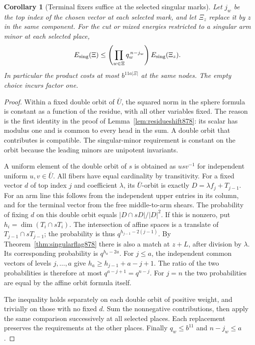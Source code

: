 \documentclass[a4paper,11pt]{article}
\newtheorem{corollary}[proposition]{Corollary}
\theoremstyle{definition}
\theoremstyle{remark}
\numberwithin{equation}{section}
\begin{document}
\begin{corollary}[Terminal fixers suffice at the selected singular marks]
\leavevmode\label{cor:terminalfixer878}
Let \(j_w\) be the top index of the chosen vector at each selected
mark, and let \(\Xi_z\) replace it by \(z\) in the same component.
For the cut or mixed energies restricted to a singular arm minor
at each selected place,
\begin{equation}
             E_{\rm sing}(\Xi)
       \le \left(\prod_{w\in\Xi}q_w^{\,n-j_w}\right)
                         E_{\rm sing}(\Xi_z).
 \label{eq:terminalfixer878}
\end{equation}
In particular the product costs at most \(b^{11a|\Xi|}\) at the same
nodes. The empty choice incurs factor one.
\end{corollary}
\begin{proof}
Within a fixed double orbit of \(\bar U\), the squared norm in the
sphere formula is constant as a function of the residue, with all
other variables fixed. The reason is the first identity in the proof
of Lemma~\ref{lem:residueshift878}: its scalar has modulus one and is
common to every head in the sum. A double orbit that contributes
is compatible. The singular-minor requirement is constant on the
orbit because the leading minors are unipotent invariants.

A uniform element of the double orbit of \(s\) is obtained as
\(u s v^{-1}\) for independent uniform \(u,v\in\bar U\). All fibers
have equal cardinality by transitivity. For a fixed vector \(d\)
of top index \(j\) and coefficient \(\lambda\), its \(\bar U\)-orbit
is exactly \(D=\lambda f_j+T_{j-1}\). For an arm line this follows
from the independent upper entries in its column, and for the
terminal vector from the free middle-to-arm shears. The probability
of fixing \(d\) on this double orbit equals
\(|D\cap sD|/|D|^2\). If this is nonzero, put
\(h_i=\dim(T_i\cap sT_i)\). The intersection of affine spaces is a
translate of \(T_{j-1}\cap sT_{j-1}\); the probability is thus
\(q^{h_{j-1}-2(j-1)}\). By Theorem~\ref{thm:singularflag878}
there is also a match at \(z+L\), after division by \(\lambda\).
Its corresponding probability is \(q^{h_a-2a}\). For \(j\le a\),
the independent common vectors of levels \(j,\ldots,a\) give
\(h_a\ge h_{j-1}+a-j+1\). The ratio of the two probabilities
is therefore at most \(q^{a-j+1}=q^{n-j}\). For \(j=n\) the two
probabilities are equal by the affine orbit formula itself.

The inequality holds separately on each double orbit of positive
weight, and trivially on those with no fixed \(d\). Sum the
nonnegative contributions, then apply the same comparison successively
at all selected places. Each replacement preserves the requirements
at the other places. Finally \(q_w\le b^{11}\) and \(n-j_w\le a\).
\end{proof}
\end{document}
